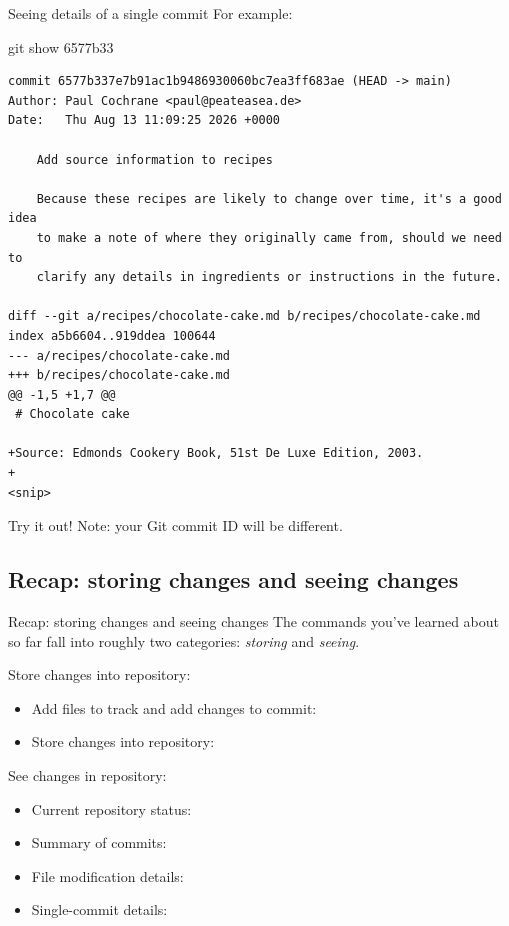 \documentclass{git_course}
\begin{document}
\begin{frame}[fragile]{Seeing details of a single commit}
    For example:
    \begin{shellcode}
        git show 6577b33
    \end{shellcode}
    \begin{verbatim}
commit 6577b337e7b91ac1b9486930060bc7ea3ff683ae (HEAD -> main)
Author: Paul Cochrane <paul@peateasea.de>
Date:   Thu Aug 13 11:09:25 2026 +0000

    Add source information to recipes

    Because these recipes are likely to change over time, it's a good idea
    to make a note of where they originally came from, should we need to
    clarify any details in ingredients or instructions in the future.

diff --git a/recipes/chocolate-cake.md b/recipes/chocolate-cake.md
index a5b6604..919ddea 100644
--- a/recipes/chocolate-cake.md
+++ b/recipes/chocolate-cake.md
@@ -1,5 +1,7 @@
 # Chocolate cake

+Source: Edmonds Cookery Book, 51st De Luxe Edition, 2003.
+
<snip>
    \end{verbatim}
    Try it out!  Note: your Git commit ID will be different.
\end{frame}

\subsection{Recap: storing changes and seeing changes}

\begin{frame}[fragile]{Recap: storing changes and seeing changes}
    The commands you've learned about so far fall into roughly two categories:
    \emph{storing} and \emph{seeing}.

    Store changes into repository:
    \begin{itemize}
        \item Add files to track and add changes to commit: 
        \item Store changes into repository: 
    \end{itemize}

    See changes in repository:
    \begin{itemize}
        \item Current repository status: 
        \item Summary of commits: 
        \item File modification details: 
        \item Single-commit details: 
    \end{itemize}
\end{frame}
\end{document}
